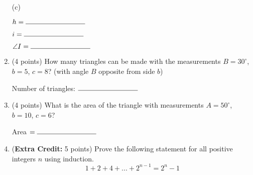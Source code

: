 \documentclass[11pt]{article}
\begin{document}
\begin{enumerate}
\newpage

(c) \\



\begin{flushright}
$h=\rule{3cm}{0.4pt}$
\end{flushright}
\begin{flushright}
$i=\rule{3cm}{0.4pt}$
\end{flushright}
\begin{flushright}
$\angle I=\rule{3cm}{0.4pt}$
\end{flushright}
\vspace{40pt}


\item (4 points) How many triangles can be made with the measurements $B=30^{\circ}$, $b=5$, $c=8$? (with angle $B$ opposite from side $b$) 
\vspace{100pt}
\begin{flushright}
Number of triangles: $\rule{3cm}{0.4pt}$
\end{flushright}

\newpage

\item (4 points) What is the area of the triangle with measurements $A=50^{\circ}$, $b=10$, $c=6$?
\vspace{100pt}
\begin{flushright}
Area $= \rule{3cm}{0.4pt}$
\end{flushright}
\vspace{20pt}

\item (\textbf{Extra Credit:} 5 points) Prove the following statement for all positive integers $n$ using induction. \\
$$1 + 2 + 4 + ... + 2^{n-1} = 2^n - 1 $$

\end{enumerate}
\end{document}
